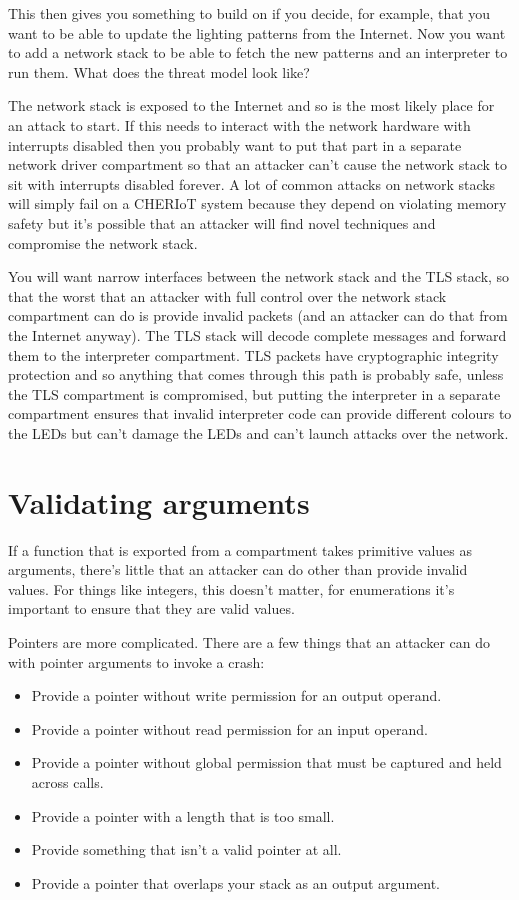 This then gives you something to build on if you decide, for example, that you want to be able to update the lighting patterns from the Internet.
Now you want to add a network stack to be able to fetch the new patterns and an interpreter to run them.
What does the threat model look like?

The network stack is exposed to the Internet and so is the most likely place for an attack to start.
If this needs to interact with the network hardware with interrupts disabled then you probably want to put that part in a separate network driver compartment so that an attacker can't cause the network stack to sit with interrupts disabled forever.
A lot of common attacks on network stacks will simply fail on a CHERIoT system because they depend on violating memory safety but it's possible that an attacker will find novel techniques and compromise the network stack.

You will want narrow interfaces between the network stack and the TLS stack, so that the worst that an attacker with full control over the network stack compartment can do is provide invalid packets (and an attacker can do that from the Internet anyway).
The TLS stack will decode complete messages and forward them to the interpreter compartment.
TLS packets have cryptographic integrity protection and so anything that comes through this path is probably safe, unless the TLS compartment is compromised, but putting the interpreter in a separate compartment ensures that invalid interpreter code can provide different colours to the LEDs but can't damage the LEDs and can't launch attacks over the network.

\section{Validating arguments}

If a function that is exported from a compartment takes primitive values as arguments, there's little that an attacker can do other than provide invalid values.
For things like integers, this doesn't matter, for enumerations it's important to ensure that they are valid values.

Pointers are more complicated.
There are a few things that an attacker can do with pointer arguments to invoke a crash:

\begin{itemize}
	\item{Provide a pointer without write permission for an output operand.}
	\item{Provide a pointer without read permission for an input operand.}
	\item{Provide a pointer without global permission that must be captured and held across calls.}
	\item{Provide a pointer with a length that is too small.}
	\item{Provide something that isn't a valid pointer at all.}
	\item{Provide a pointer that overlaps your stack as an output argument.}
\end{itemize}

